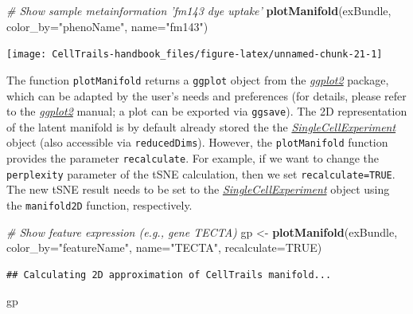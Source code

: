 \documentclass[]{book}
\newenvironment{Shaded}{\begin{snugshade}}{\end{snugshade}}
\newcommand{\KeywordTok}[1]{\textcolor[rgb]{0.13,0.29,0.53}{\textbf{#1}}}
\newcommand{\DataTypeTok}[1]{\textcolor[rgb]{0.13,0.29,0.53}{#1}}
\newcommand{\StringTok}[1]{\textcolor[rgb]{0.31,0.60,0.02}{#1}}
\newcommand{\CommentTok}[1]{\textcolor[rgb]{0.56,0.35,0.01}{\textit{#1}}}
\newcommand{\OtherTok}[1]{\textcolor[rgb]{0.56,0.35,0.01}{#1}}
\newcommand{\NormalTok}[1]{#1}
\theoremstyle{definition}
\theoremstyle{definition}
\theoremstyle{definition}
\theoremstyle{remark}
\begin{document}
\begin{Shaded}
\begin{Highlighting}[]
\CommentTok{# Show sample metainformation 'fm143 dye uptake'}
\KeywordTok{plotManifold}\NormalTok{(exBundle, }\DataTypeTok{color_by=}\StringTok{"phenoName"}\NormalTok{, }\DataTypeTok{name=}\StringTok{"fm143"}\NormalTok{)}
\end{Highlighting}
\end{Shaded}

\texttt{[image: CellTrails-handbook\_files/figure-latex/unnamed-chunk-21-1]}

The function \texttt{plotManifold} returns a \texttt{ggplot} object
\citep{ggplot2} from the
\emph{\href{https://CRAN.R-project.org/package=ggplot2}{ggplot2}}
package, which can be adapted by the user's needs and preferences (for
details, please refer to the
\emph{\href{https://CRAN.R-project.org/package=ggplot2}{ggplot2}}
manual; a plot can be exported via \texttt{ggsave}). The 2D
representation of the latent manifold is by default already stored the
the
\emph{\href{http://bioconductor.org/packages/SingleCellExperiment}{SingleCellExperiment}}
object (also accessible via \texttt{reducedDims}). However, the
\texttt{plotManifold} function provides the parameter
\texttt{recalculate}. For example, if we want to change the
\texttt{perplexity} parameter of the tSNE calculation, then we set
\texttt{recalculate=TRUE}. The new tSNE result needs to be set to the
\emph{\href{http://bioconductor.org/packages/SingleCellExperiment}{SingleCellExperiment}}
object using the \texttt{manifold2D} function, respectively.

\begin{Shaded}
\begin{Highlighting}[]
\CommentTok{# Show feature expression (e.g., gene TECTA)}
\NormalTok{gp <-}\StringTok{ }\KeywordTok{plotManifold}\NormalTok{(exBundle, }\DataTypeTok{color_by=}\StringTok{"featureName"}\NormalTok{, }\DataTypeTok{name=}\StringTok{"TECTA"}\NormalTok{, }\DataTypeTok{recalculate=}\OtherTok{TRUE}\NormalTok{)}
\end{Highlighting}
\end{Shaded}

\begin{verbatim}
## Calculating 2D approximation of CellTrails manifold...
\end{verbatim}

\begin{Shaded}
\begin{Highlighting}[]
\NormalTok{gp}
\end{Highlighting}
\end{Shaded}
\end{document}
